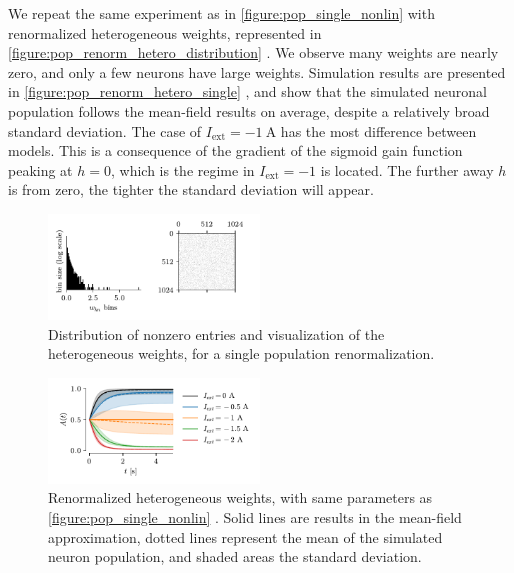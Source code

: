 \documentclass[10pt,conference,compsocconf,a4paper]{IEEEtran}
\newcommand{\nunit}[1]{\ \si{#1}}
\newcommand*{\shortautoref}[1]{%
	\begingroup
	\def\equationautorefname{\textsc{Eq.}}%
	\def\tableautorefname{\textsc{Tab.}}%
	\def\figureautorefname{\textsc{Fig.}}%
	\autoref{#1}%
	\endgroup
}
\begin{document}
			We repeat the same experiment as in \shortautoref{figure:pop_single_nonlin} with renormalized heterogeneous weights, represented in \shortautoref{figure:pop_renorm_hetero_distribution}. We observe many weights are nearly zero, and only a few neurons have large weights. Simulation results are presented in \shortautoref{figure:pop_renorm_hetero_single}, and show that the simulated neuronal population follows the mean-field results on average, despite a relatively broad standard deviation. The case of $I_{\text{ext}} = -1 \nunit{\ampere}$ has the most difference between models. This is a consequence of the gradient of the sigmoid gain function peaking at $h = 0$, which is the regime in $I_{\text{ext}} = -1$ is located. The further away $h$ is from zero, the tighter the standard deviation will appear.

			\begin{figure}
				\centering
				\includegraphics[width=0.5\textwidth]{figures/pop_renorm_hetero_distribution.pdf}
				\caption{Distribution of nonzero entries and visualization of the heterogeneous weights, for a single population renormalization.}
				\label{figure:pop_renorm_hetero_distribution}
			\end{figure}

			\begin{figure}
				\centering
				\includegraphics[width=0.5\textwidth]{figures/pop_renorm_hetero_single.pdf}
				\caption{Renormalized heterogeneous weights, with same parameters as \shortautoref{figure:pop_single_nonlin}. Solid lines are results in the mean-field approximation, dotted lines represent the mean of the simulated neuron population, and shaded areas the standard deviation.}
				\label{figure:pop_renorm_hetero_single}
			\end{figure}
	
\end{document}
